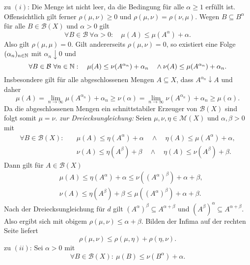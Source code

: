 \begin{proof*}
    zu $(i)$: Die Menge ist nicht leer, da die Bedingung für alle $\alpha \geq 1$ erfüllt ist. Offensichtlich gilt ferner $\rho(\mu, \nu) \geq 0$ und $\rho(\mu, \nu) = \rho(\nu, \mu)$. 
    Wegen $B \subseteq B^{\alpha}$ für alle $B \in \mathcal{B}(X)$ und $\alpha > 0$ gilt 
    $$
        \forall B \in \mathcal{B} \ \forall \alpha > 0: \quad \mu(A) \leq \mu(A^{\alpha}) + \alpha.
    $$
    Also gilt $\rho(\mu, \mu) = 0$. Gilt andererseits $\rho(\mu, \nu) = 0$, so existiert eine Folge $(\alpha_n)_{n \in \mathbb{N}}$ mit $\alpha_n \downarrow 0$ und
    $$
    \forall B \in \mathcal{B} \ \forall n \in \mathbb{N}: \quad \mu(A) \leq \nu(A^{\alpha_n}) + \alpha_n \quad \land \nu(A) \leq \mu(A^{\alpha_n}) + \alpha_n.
    $$
    Insbesondere gilt für alle abgeschlossenen Mengen $A \subseteq X$, dass $A^{\alpha_n} \downarrow A$ und daher
    $$
        \mu(A) = \lim_{n \to \infty} \mu(A^{\alpha_n}) + \alpha_n \geq \nu(\alpha) = \lim_{n \to \infty} \nu(A^{\alpha_n}) + \alpha_n \geq \mu(\alpha). 
    $$
    Da die abgeschlossenen Mengen ein schnittstabiler Erzeuger von $\mathcal{B}(X)$ sind folgt somit $\mu = \nu$.
    \newline
    \textit{zur Dreiecksungleichung:} Seien $\mu, \nu, \eta \in \mathcal{M}(X)$ und $\alpha, \beta > 0$ mit 
    \begin{align*}
        \forall B \in \mathcal{B}(X): \quad &\mu(A) \leq \eta(A^{\alpha}) + \alpha \quad \land \quad \eta(A) \leq \mu(A^{\alpha}) + \alpha, \\\
                                            &\nu(A) \leq \eta(A^{\beta}) + \beta \quad \land \quad \eta(A) \leq \nu(A^{\beta}) + \beta.
    \end{align*}
    Dann gilt für $A \in \mathcal{B}(X)$
    \begin{align*}
        &\mu(A) \leq \eta(A^{\alpha}) + \alpha \leq \nu((A^{\alpha})^{\beta}) + \alpha + \beta, \\\
        &\nu(A) \leq \eta(A^{\beta}) + \beta \leq \mu((A^{\alpha})^{\beta}) + \alpha + \beta. 
    \end{align*}
    Nach der Dreiecksungleichung für $d$ gilt $(A^{\alpha})^{\beta} \subseteq A^{\alpha + \beta}$ und $(A^{\beta})^{\alpha} \subseteq A^{\alpha + \beta}$. Also ergibt sich mit obigem $\rho(\mu, \nu) \leq \alpha + \beta$. 
    Bilden der Infima auf der rechten Seite liefert
    $$
        \rho(\mu, \nu) \leq \rho(\mu, \eta) + \rho(\eta, \nu).
    $$
    zu $(ii)$: Sei $\alpha > 0$ mit 
    $$
        \forall B \in \mathcal{B}(X): \ \mu(B) \leq \nu(B^{\alpha}) + \alpha.
$$
\end{proof*}
